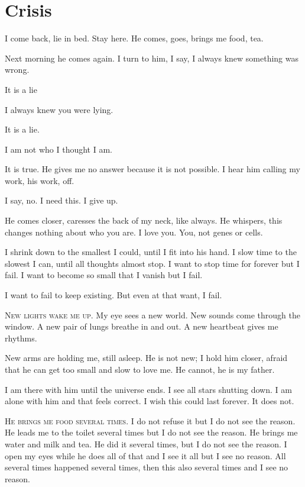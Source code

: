\chapter*{Crisis}\label{crisis}

I come back, lie in bed. Stay here. He comes, goes, brings me food, tea.

Next morning he comes again. I turn to him, I say, I always knew something was wrong.

It is a lie 

I always knew you were lying.

It is a lie.

I am not who I thought I am. 

It is true. He gives me no answer because it is not possible. I hear him calling my work, his work, off.

I say, no. I need this. I give up.

He comes closer, caresses the back of my neck, like always. He whispers, this changes nothing about who you are. I love you. You, not genes or cells.

I shrink down to the smallest I could, until I fit into his hand. I slow time to the slowest I can, until all thoughts almost stop. I want to stop time for forever but I fail. I want to become so small that I vanish but I fail.

I want to fail to keep existing. But even at that want, I fail.

\bigskip\thinspace\textsc{New lights wake me up.} My eye sees a new world. New sounds come through the window. A new pair of lungs breathe in and out. A new heartbeat gives me rhythms. 

New arms are holding me, still asleep. He is not new; I hold him closer, afraid that he can get too small and slow to love me. He cannot, he is my father. 

I am there with him until the universe ends. I see all stars shutting down. I am alone with him and that feels correct. I wish this could last forever. It does not. 

\bigskip\thinspace\textsc{He brings me food several times}. I do not refuse it but I do not see the reason. He leads me to the toilet several times but I do not see the reason. He brings me water and milk and tea. He did it several times, but I do not see the reason. I open my eyes while he does all of that and I see it all but I see no reason. All several times happened several times, then this also several times and I see no reason.

